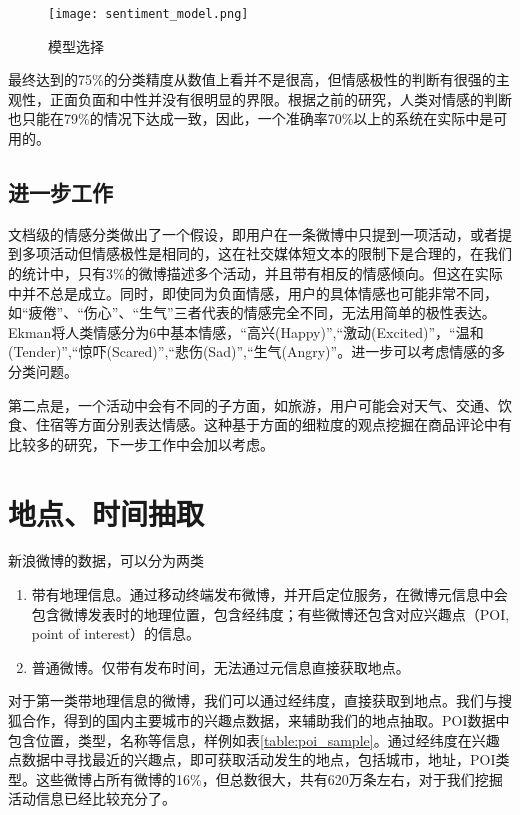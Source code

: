 \begin{figure}[!h]
\centering
\texttt{[image: sentiment\_model.png]}
\caption{模型选择}
\label{fig:sentiment_model}
\end{figure}

最终达到的75\%的分类精度从数值上看并不是很高，但情感极性的判断有很强的主观性，正面负面和中性并没有很明显的界限。根据之前的研究，人类对情感的判断也只能在79\%的情况下达成一致，因此，一个准确率70\%以上的系统在实际中是可用的。

\subsection{进一步工作}
文档级的情感分类做出了一个假设，即用户在一条微博中只提到一项活动，或者提到多项活动但情感极性是相同的，这在社交媒体短文本的限制下是合理的，在我们的统计中，只有3\%的微博描述多个活动，并且带有相反的情感倾向。但这在实际中并不总是成立。同时，即使同为负面情感，用户的具体情感也可能非常不同，如``疲倦''、``伤心''、``生气''三者代表的情感完全不同，无法用简单的极性表达。Ekman\cite{ekman1992argument}将人类情感分为6中基本情感，``高兴(Happy)'',``激动(Excited)''，``温和(Tender)'',``惊吓(Scared)'',``悲伤(Sad)'',``生气(Angry)''。进一步可以考虑情感的多分类问题。

第二点是，一个活动中会有不同的子方面，如旅游，用户可能会对天气、交通、饮食、住宿等方面分别表达情感。这种基于方面的细粒度的观点挖掘在商品评论中有比较多的研究，下一步工作中会加以考虑。

\section{地点、时间抽取}
新浪微博的数据，可以分为两类
\begin{enumerate}
\item 带有地理信息。通过移动终端发布微博，并开启定位服务，在微博元信息中会包含微博发表时的地理位置，包含经纬度；有些微博还包含对应兴趣点（POI, point of interest）的信息。
\item 普通微博。仅带有发布时间，无法通过元信息直接获取地点。
\end{enumerate}

对于第一类带地理信息的微博，我们可以通过经纬度，直接获取到地点。我们与搜狐合作，得到的国内主要城市的兴趣点数据，来辅助我们的地点抽取。POI数据中包含位置，类型，名称等信息，样例如表\ref{table:poi_sample}。通过经纬度在兴趣点数据中寻找最近的兴趣点，即可获取活动发生的地点，包括城市，地址，POI类型。这些微博占所有微博的16\%，但总数很大，共有620万条左右，对于我们挖掘活动信息已经比较充分了。

